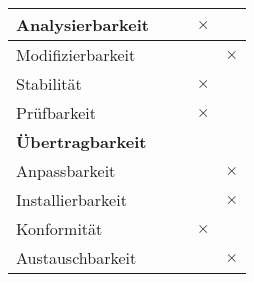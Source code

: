 \begin{table}[H]
\begin{tabular}{|l|p{2cm}|p{2cm}|p{2cm}|p{2cm}|}
		\quad Analysierbarkeit      &          &          & $\times$ &  \\ \hline
		\quad Modifizierbarkeit     &          &          &          & $\times$       \\ \hline
		\quad Stabilität            &          &          & \centering  $\times$ &  \\ \hline
		\quad Prüfbarkeit           &          &          & \centering $\times$ &  \\ \hline
		\multicolumn{5}{|l|}{\textbf{Übertragbarkeit}}                          \\ \hline
		\quad Anpassbarkeit         &          &          &          & $\times$       \\ \hline
		\quad Installierbarkeit     &          &          &          & $\times$       \\ \hline
		\quad Konformität           &          &          & $\times$ &  \\ \hline
		\quad Austauschbarkeit      &          &          &          & $\times$       \\ \hline
	\end{tabular}%
	\label{tab:QualAnfor}%
\end{table}%